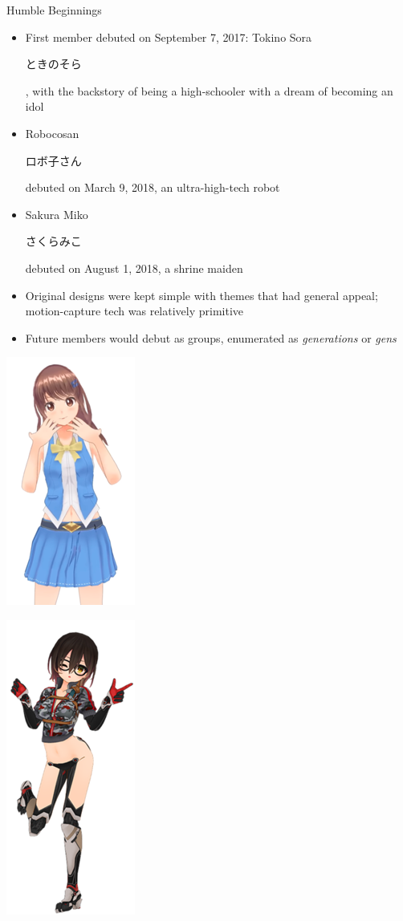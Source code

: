 \documentclass[aspectratio=169]{beamer}
\begin{document}
\begin{frame}{Humble Beginnings}
    \begin{itemize}
        \item First member debuted on September 7, 2017: Tokino Sora \begin{CJK}{UTF8}{min}ときのそら\end{CJK}, with the backstory of being a high-schooler with a dream of becoming an idol
        \item Robocosan \begin{CJK}{UTF8}{min}ロボ子さん\end{CJK} debuted on March 9, 2018, an ultra-high-tech robot
        \item Sakura Miko \begin{CJK}{UTF8}{min}さくらみこ\end{CJK} debuted on August 1, 2018, a shrine maiden
        \item Original designs were kept simple with themes that had general appeal; motion-capture tech was relatively primitive
        \item Future members would debut as groups, enumerated as \textit{generations} or \textit{gens}
    \end{itemize}
    \begin{minipage}{0.3\textwidth}
        \centering
        \includegraphics[width=.3\linewidth]{images/sora.png}
    \end{minipage}
    \begin{minipage}{0.3\textwidth}
        \centering
        \includegraphics[width=.3\linewidth]{images/roboco.png}

\end{minipage}
\end{frame}
\end{document}
